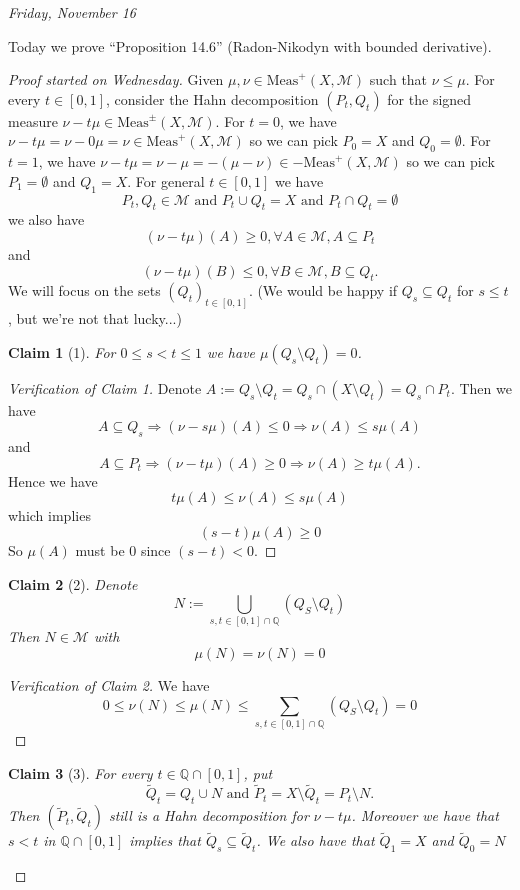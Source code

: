 \documentclass[letterpaper, 12pt]{article}
\newcommand{\cM}{\mathcal{M}}
\newcommand{\bQ}{\mathbb{Q}}
\newcommand{\Meas}{\mathrm{Meas}}
\theoremstyle{stdthm}
\theoremstyle{stddef}
\theoremstyle{stdnonum}
\newtheorem{claim}{Claim}
\theoremstyle{stdqands}
\theoremstyle{stdbold}
\begin{document}
\begin{center}
\emph{Friday, November 16}
\end{center}

Today we prove ``Proposition 14.6'' (Radon-Nikodyn with bounded derivative).

\begin{proof}[Proof started on Wednesday]
Given $\mu,\nu\in\Meas^+(X,\cM)$ such that $\nu\leq \mu$. For every $t\in[0,1]$, consider the Hahn decomposition $(P_t,Q_t)$ for the signed measure $\nu-t\mu\in\Meas^\pm(X,\cM)$. For $t=0$, we have $\nu-t\mu =  \nu -0\mu = \nu\in\Meas^+(X,\cM)$ so we can pick $P_0=X$ and $Q_0 = \emptyset$. For $t=1$, we have $\nu-t\mu =  \nu - \mu = -(\mu-\nu)\in -\Meas^+(X,\cM)$ so we can pick $P_1=\emptyset$ and $Q_1 = X$. For general $t\in[0,1]$ we have 
\[
P_t,Q_t\in\cM \mbox{ and } P_t\cup Q_t = X \mbox{ and } P_t\cap Q_t = \emptyset
\]
we also have
\[
(\nu-t\mu)(A)\geq 0, \forall A\in \cM, A\subseteq P_t
\]
and
\[
(\nu-t\mu)(B)\leq 0, \forall B\in \cM, B\subseteq Q_t.
\]
We will focus on the sets $(Q_t)_{t\in[0,1]}$. (We would be happy if $Q_s\subseteq Q_t$ for $s\leq t$, but we're not that lucky...)

\begin{claim}[1]
For $0\leq s < t\leq 1$ we have $\mu(Q_s\setminus Q_t) = 0$.
\end{claim}
\begin{proof}[Verification of Claim 1]
Denote $A:=Q_s\setminus Q_t = Q_s\cap (X\setminus Q_t) = Q_s\cap P_t$. Then we have
\[
A\subseteq Q_s \Longrightarrow (\nu-s\mu)(A)\leq 0 \Longrightarrow \nu(A)\leq s\mu(A)
\]
and
\[
A\subseteq P_t \Longrightarrow (\nu-t\mu)(A)\geq 0 \Longrightarrow \nu(A)\geq t\mu(A).
\]
Hence we have
\[
t\mu(A)\leq \nu(A) \leq s\mu(A)
\]
which implies
\[
(s-t)\mu(A)\geq 0
\]
So $\mu(A)$ must be 0 since $(s-t)<0$.
\end{proof}


\begin{claim}[2]
Denote \[
N:=\bigcup_{s,t\in[0,1]\cap\bQ}(Q_S\setminus Q_t)
\]
Then $N\in\cM$ with
\[
\mu(N)=\nu(N) = 0
\]
\end{claim}

\begin{proof}[Verification of Claim 2]
We have
\[
0\leq \nu(N) \leq \mu(N) \leq \sum_{s,t\in[0,1]\cap\bQ}(Q_S\setminus Q_t) = 0
\]
\end{proof}

\begin{claim}[3]
For every $t\in\bQ\cap[0,1]$, put
\[
\tilde{Q}_t = Q_t\cup N \mbox{ and } \tilde{P}_t = X\setminus \tilde{Q}_t = P_t\setminus N.
\]
Then $(\tilde{P}_t,\tilde{Q}_t)$ still is a Hahn decomposition for $\nu-t\mu$. Moreover we have that $s<t$ in $\bQ\cap [0,1]$  implies that $\tilde{Q}_s\subseteq \tilde{Q}_t$. We also have that $\tilde{Q}_1=X$ and $\tilde{Q}_0 = N$
\end{claim}


\end{proof}
\end{document}
